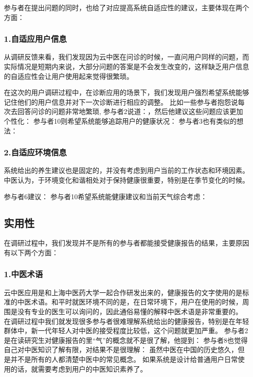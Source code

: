 参与者在提出问题的同时，也给了对应提高系统自适应性的建议，主要体现在两个方面：

\subsubsection{1.自适应用户信息}

从调研反馈来看，我们发现因为云中医在问诊的时候，一直问用户同样的问题，而实际情况是短期内来说，大部分问题的答案是不会发生改变的，这样缺乏用户信息的自适应性会让用户使用起来觉得很繁琐。

在这次的用户调研过程中，在诊断应用的场景下，我们发现用户强烈希望系统能够记住他们的用户信息并对下一次诊断进行相应的调整。
比如一些参与者抱怨说每次去回答问诊的问题非常地繁琐, 参与者2说道：，然后他建议这些问题应该更加个性化：
参与者10则希望系统能够追踪用户的健康状况：
参与者3也有类似的想法：

\subsubsection{2.自适应环境信息}

系统给出的养生建议也是固定的，并没有考虑到用户当前的工作状态和环境因素。中医认为，于环境变化和谐相处对于保持健康很重要，特别是在季节变化的时候。

参与者6建议： 
参与者10希望系统能健康建议和当前天气综合考虑：

\subsection{实用性}
在调研过程中，我们发现并不是所有的参与者都能接受健康报告的结果，主要原因有以下两个方面：

\subsubsection{1.中医术语}

云中医应用是和上海中医药大学一起合作研发出来的，健康报告的文字使用的是标准的中医术语。和平时就医环境不同的是，在日常环境下，用户在使用的时候，周围是没有专业的医生可以询问的，因此通俗易懂的解释中医术语是非常重要的。
在调研过程中我们就发现很多参与者很难理解系统给出的健康报告，特别是在年轻群体中，新一代年轻人对中医的接受程度比较低，这个问题就更加严重。
参与者2是在读研究生对健康报告的里“气”的概念就不是很了解，他提到：
参与者8也觉得自己对中医知识了解有限，对结果不是很理解：
虽然中医在中国的历史悠久，但是并不是所有的人都清楚中医中的常见概念。 如果系统是设计给普通用户日常使用的话，就需要考虑到用户的中医知识素养了。

